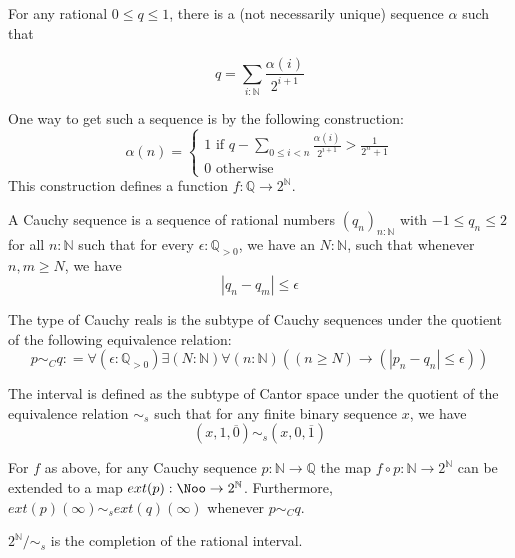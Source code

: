For any rational $0\leq q \leq 1$, there is a (not necessarily unique) sequence $\alpha$ such that 

\begin{equation}q = \sum_{i : \mathbb N} \frac{\alpha(i)}{2^{i+1}}\end{equation}

One way to get such a sequence is by the following construction:
\begin{equation}\alpha(n)  = \begin{cases}
  1 \text{ if } q - \sum_{0\leq i < n} \frac{\alpha(i)}{2^{i+1}} > \frac 1 {2 ^ n + 1} \\
0 \text{ otherwise } 
\end{cases}
\end{equation} 
This construction defines a function $f: \mathbb Q \to 2^\mathbb N$. 
\begin{definition}
  A Cauchy sequence is a sequence of rational numbers $(q_n)_{n: \mathbb N}$ with $-1 \leq q_n \leq 2$ 
  for all $n:\mathbb N$
  such that for every $\epsilon: \mathbb Q_{>0}$, we have an $N:\mathbb N$, 
  such that whenever $n,m \geq N$, we have 
\begin{equation}
  | q_n - q_m | \leq \epsilon
\end{equation} 
\end{definition}
\begin{definition}
  The type of Cauchy reals is the subtype of Cauchy sequences under the quotient of the following 
  equivalence relation:
\begin{equation}
  p \sim_C q : = \forall (\epsilon : \mathbb Q_{>0} )\exists ( N :\mathbb N) \forall (n : \mathbb N) ((n \geq N) \to 
  (| p_n - q_n| \leq  \epsilon))
\end{equation}
\end{definition}


\begin{definition}
  The interval is defined as the subtype of Cantor space under the quotient of the equivalence relation
  $\sim_s$ such that for any finite binary sequence $x$, we have
  \begin{equation}(x,1,\overline 0) \sim_s (x ,0, \overline 1)\end{equation}
\end{definition} 



\begin{proposition}
  For $f$ as above, for any Cauchy sequence $p: \mathbb N \to \mathbb Q$ 
  the map $f\circ p: \mathbb N \to 2^\mathbb N$ can be extended to a map 
  $ext(p) : \Noo \to 2^\mathbb N$. 
  Furthermore, $ext(p)(\infty) \sim_s ext(q)(\infty)$ whenever $p \sim_C q$. 
\end{proposition} 
\begin{corollary}
  $2^\mathbb N/\sim_s$ is the completion of the rational interval. 
\end{corollary}

